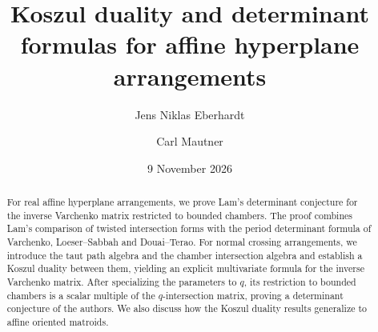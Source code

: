 \title[Koszul duality and determinant formulas]{Koszul duality and
determinant formulas for affine hyperplane arrangements}
\author{Jens Niklas Eberhardt}
\author{Carl Mautner}
\date{9 November 2026}

\begin{abstract}
For real affine hyperplane arrangements, we prove Lam's determinant
conjecture for the inverse Varchenko matrix restricted to bounded chambers.  The proof combines Lam's comparison
of twisted intersection forms with the period determinant formula of
Varchenko, Loeser--Sabbah and Douai--Terao.
For normal crossing arrangements, we introduce the taut path algebra and the chamber intersection algebra and establish a Koszul duality between
them, yielding an
explicit multivariate formula for the inverse Varchenko matrix.
After specializing the parameters to $q$, its restriction to bounded chambers
is a scalar multiple of the $q$-intersection matrix, proving a determinant
conjecture of the authors.  We also discuss how the Koszul duality
results generalize to affine oriented matroids.
\end{abstract}
\maketitle

